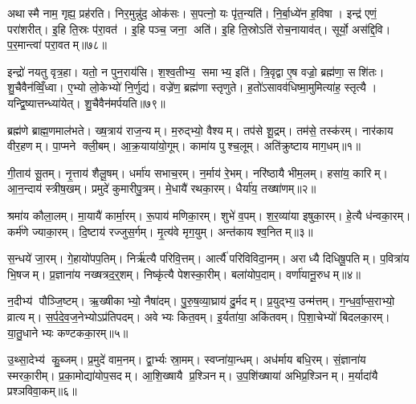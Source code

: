 अथास्मै नाम॒ गृह्य॒ प्रह॑रति। निर॒मुन्नु॑द॒ ओक॑सः। स॒पत्नो॒ यः पृ॑त॒न्यति॑। नि॒र्बा॒ध्ये॑न ह॒विषा। इन्द्र॑ एणं॒ परा॑शरीत्। इ॒हि ति॒स्रः प॑रा॒वत॑। इ॒हि पञ्च॒ जना॒ अति॑। इ॒हि ति॒स्रोऽति॑ रोच॒नायाव॑त्। सूर्यो॒ अस॑द्दि॒वि। प॒र॒मान्त्वा॑ परा॒वतम्॥७८॥

इन्द्रो॑ नयतु वृत्र॒हा। यतो॒ न पुन॒राय॑सि। श॒श्व॒तीभ्य॒ समाभ्य॒ इति॑। त्रि॒वृद्वा ए॒ष वज्रो॒ ब्रह्म॑णा॒ सशि॑तः। शु॒चैवैन॑व्विँ॒ध्वा। ए॒भ्यो लो॒केभ्यो॑ नि॒र्णुद्य॑। वज्रे॑ण॒ ब्रह्म॑णा स्तृणुते। ह॒तो॑ऽसावव॑धिष्मा॒मुमित्या॑ह॒ स्तृत्यै। यन्द्वि॒ष्यात्तन्ध्या॑येत्। शु॒चैवैन॑मर्पयति॥७९॥



\clearpage
{}
\setcounter{anuvakam}{0}
ब्रह्म॑णे ब्राह्म॒णमाल॑भते। ख्ष॒त्राय॑ राज॒न्यम्। म॒रुद्भ्यो॒ वैश्यम्। तप॑से शू॒द्रम्। तम॑से॒ तस्क॑रम्। नार॑काय वीर॒हणम्। पा॒प्मने क्ली॒बम्। आ॒क्र॒याया॑यो॒गूम्। कामा॑य पुश्च॒लूम्। अति॑क्रुष्टाय माग॒धम्॥१॥

गी॒ताय॑ सू॒तम्। नृ॒त्ताय॑ शैलू॒षम्। धर्मा॑य सभाच॒रम्। न॒र्माय॑ रे॒भम्। नरि॑ष्ठायै भीम॒लम्। हसा॑य॒ कारिम्। आ॒न॒न्दाय॑ स्त्रीष॒खम्। प्रमुदे॑ कुमारीपु॒त्रम्। मे॒धायै॑ रथका॒रम्। धैर्या॑य॒ तख्षा॑णम्॥२॥

श्रमा॑य कौला॒लम्। मा॒यायै॑ कार्मा॒रम्। रू॒पाय॑ मणिका॒रम्। शुभे॑ व॒पम्। श॒र॒व्या॑या इषुका॒रम्। हे॒त्यै ध॑न्वका॒रम्। कर्म॑णे ज्याका॒रम्। दि॒ष्टाय॑ रज्जुस॒र्गम्। मृ॒त्य॑वे मृग॒युम्। अन्त॑काय श्व॒नितम्॥३॥

स॒न्धये॑ जा॒रम्। गे॒हायो॑पप॒तिम्। निर्\mbox{}ऋ॑त्यै परिवि॒त्तम्। आर्त्यै॑ परिविविदा॒नम्। अराध्यै दिधिषू॒पतिम्। प॒वित्रा॑य भि॒षजम्। प्र॒ज्ञाना॑य नख्षत्रद॒र्॒शम्। निष्कृ॑त्यै पेशस्का॒रीम्। बला॑योप॒दाम्। वर्णा॑यानू॒रुधम्॥४॥

न॒दीभ्य॑ पौञ्जि॒ष्टम्। ऋ॒ख्षीकाभ्यो॒ नैषा॑दम्। पु॒रु॒ष॒व्या॒घ्राय॑ दु॒र्मदम्। प्र॒युद्भ्य॒ उन्म॑त्तम्। ग॒न्ध॒र्वा॒प्स॒राभ्यो॒ व्रात्यम्। स॒र्प॒दे॒व॒ज॒नेभ्योऽप्र॑तिपदम्। अवेभ्यः कित॒वम्। इ॒र्यता॑या॒ अकि॑तवम्। पि॒शा॒चेभ्यो॑ बिदलका॒रम्। या॒तु॒धानेभ्यः कण्टकका॒रम्॥५॥

उ॒थ्सा॒देभ्य॑ कु॒ब्जम्। प्र॒मुदे॑ वाम॒नम्। द्वा॒र्भ्यः स्रा॒मम्। स्वप्ना॑या॒न्धम्। अध॑र्माय बधि॒रम्। सं॒ज्ञाना॑य स्मरका॒रीम्। प्र॒का॒मोद्या॑योप॒सदम्। आ॒शि॒ख्षायै प्र॒श्ञिनम्। उ॒प॒शि॑ख्षाया॑ अभिप्र॒श्ञिनम्। म॒र्यादा॑यै प्रश्ञविवा॒कम्॥६॥

